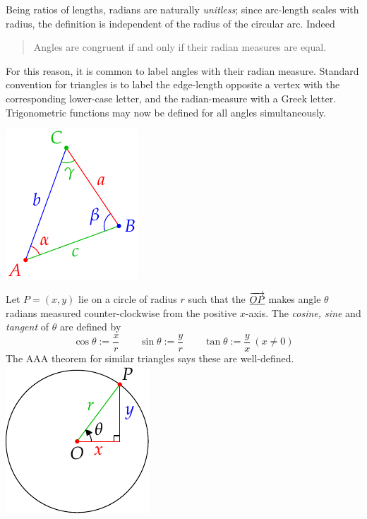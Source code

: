 Being ratios of lengths, radians are naturally \emph{unitless}; since arc-length scales with radius, the definition is independent of the radius of the circular arc. Indeed\par
\begin{minipage}[t]{0.79\linewidth}\vspace{0pt}
\begin{quote}
Angles are congruent if and only if their radian measures are equal.
\end{quote}
For this reason, it is common to label angles with their radian measure. Standard convention for triangles is to label the edge-length opposite a vertex with the corresponding lower-case letter, and the radian-measure with a Greek letter.\smallbreak
Trigonometric functions may now be defined for all angles simultaneously.
\end{minipage}\hfill\begin{minipage}[t]{0.2\linewidth}\vspace{-20pt}
\flushright\includegraphics{angle-notation}
\end{minipage}


\begin{defn}[lower separated=false, sidebyside, sidebyside align=top seam, sidebyside gap=0pt, righthand width=0.28\linewidth]{}{}
Let $P=(x,y)$ lie on a circle of radius $r$ such that the $\overrightarrow{\underline{OP}}$ makes angle $\theta$ radians measured counter-clockwise from the positive $x$-axis. The \emph{cosine, sine} and \emph{tangent} of $\theta$ are defined by
\[\cos\theta :=\frac xr\qquad \sin\theta:=\frac yr\qquad \tan\theta:=\frac yx\ (x\neq 0)\]
The AAA theorem for similar triangles says these are well-defined.
\tcblower
\flushright\includegraphics{angles-sine}
\end{defn}

